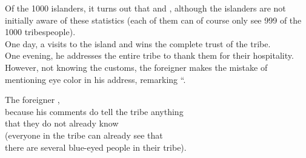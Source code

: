 \begin{frame}{}
  \begin{exampleblock}{}
    Of the 1000 islanders,
    it turns out that 
    and ,
    although the islanders are not initially aware of these statistics
    (each of them can of course only see 999 of the 1000 tribespeople). \pause\\[6pt]

    One day, a  visits to the island
    and wins the complete trust of the tribe. \pause\\[6pt]

    One evening, he addresses the entire tribe to thank them
    for their hospitality. \pause\\[6pt]

    However, not knowing the customs,
    the foreigner makes the mistake of mentioning eye color in his address,
    remarking ``. \pause\\[6pt]

  \end{exampleblock}
\end{frame}

\begin{frame}{}
  \begin{center}
    The foreigner , \pause \\[6pt]
    because his comments do  tell the tribe anything \\[6pt]
    that they do not already know \pause \\[15pt]
    (everyone in the tribe can already see that \\[6pt]
    there are several blue-eyed people in their tribe).
  \end{center}
\end{frame}

